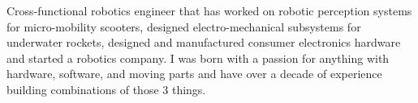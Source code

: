 

\begin{cvparagraph}

Cross-functional robotics engineer that has worked on robotic perception systems
for micro-mobility scooters, designed electro-mechanical subsystems for
underwater rockets, designed and manufactured consumer electronics hardware and
started a robotics company. I was born with a passion for anything with
hardware, software, and moving parts and have over a decade of experience
building combinations of those 3 things.
\end{cvparagraph}
